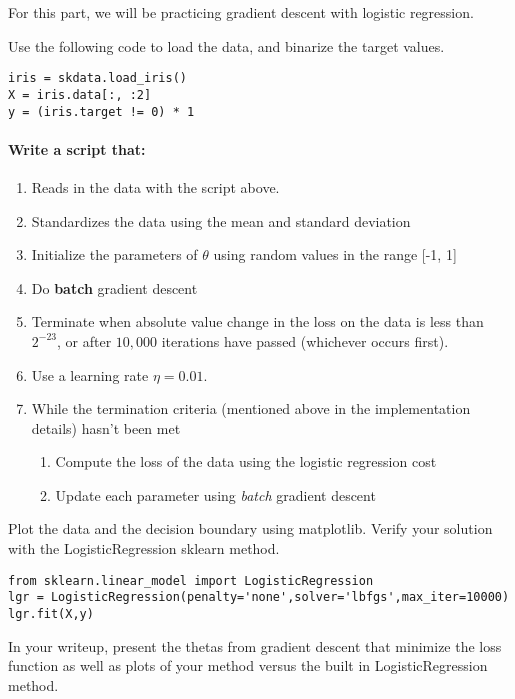 \documentclass[12pt]{article}
\begin{document}
For this part, we will be practicing gradient descent with logistic regression.

Use the following code to load the data, and binarize the target values.

\begin{lstlisting}
iris = skdata.load_iris()
X = iris.data[:, :2]
y = (iris.target != 0) * 1
\end{lstlisting}

\noindent
\paragraph{Write a script that:}
\begin{enumerate}
  \item Reads in the data with the script above.
  \item Standardizes the data using the mean and standard deviation
\item Initialize the parameters of $\theta$ using random values in the range [-1, 1]
\item Do \textbf{batch} gradient descent
\item Terminate when absolute value change in the loss on the data is less than $2^{-23}$, or after $10,000$ iterations have passed (whichever occurs first).
\item Use a learning rate $\eta=0.01$.
  \item While the termination criteria (mentioned above in the implementation details) hasn't been met
  \begin{enumerate}
  	\item Compute the loss of the data using the logistic regression cost
  	\item Update each parameter using \emph{batch} gradient descent
  \end{enumerate}
\end{enumerate}

Plot the data and the decision boundary using matplotlib.  Verify your solution with the LogisticRegression sklearn method.

\begin{lstlisting}
from sklearn.linear_model import LogisticRegression
lgr = LogisticRegression(penalty='none',solver='lbfgs',max_iter=10000)
lgr.fit(X,y)
\end{lstlisting}

In your writeup, present the thetas from gradient descent that minimize the loss function as well as plots of your method versus the built in LogisticRegression method.
\end{document}
